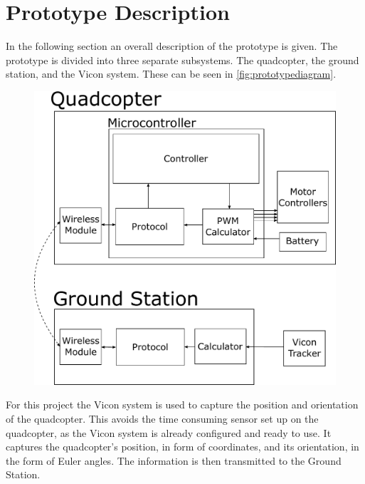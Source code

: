 \section{Prototype Description}
\label{sec:PrototypeDescription}
In the following section an overall description of the prototype is given. %
The prototype is divided into three separate subsystems. The quadcopter, the ground station, and the Vicon system. These can be seen in \autoref{fig:prototypediagram}. 

\begin{figure}[H] 
	\includegraphics[scale=.5]{figures/prototypediagram}
	\centering
	\captionsetup{justification=centering}
	\label{fig:prototypediagram}
\end{figure}


For this project the Vicon system is used to capture the position and orientation of the quadcopter. This avoids the time consuming sensor set up on the quadcopter, as the Vicon system is already configured and ready to use. It captures the quadcopter's position, in form of coordinates, and its orientation, in the form of Euler angles. The information is then transmitted to the Ground Station.

